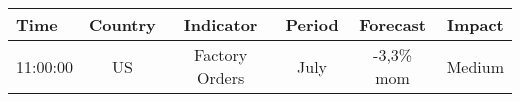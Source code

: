 \documentclass[article,crop=false]{standalone}%
\begin{document}
%
\normalsize%
\setlength{\tabcolsep}{0.15cm}%
\begin{tabular}[h]{l | c c c c c}%
\hline%
\rowcolor{white}%
\textbf{Time}&\textbf{Country}&\textbf{Indicator}&\textbf{Period}&\textbf{Forecast}&\textbf{Impact}\\%
\hline%
\rowcolor{lightgray}%
11:00:00&US&Factory Orders&July&{-}3,3\% mom&Medium\\%
\hline%
\end{tabular}%
\end{document}
